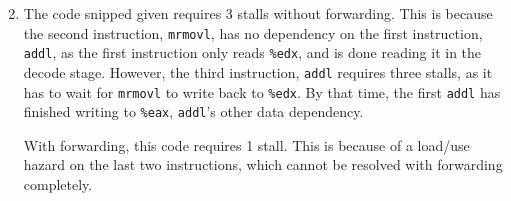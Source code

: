 \documentclass[12pt]{article}
\begin{document}
\begin{enumerate}
	\setcounter{enumi}{1}
	\item The code snipped given requires 3 stalls without forwarding.  This is
	because the second instruction, \texttt{mrmovl}, has no dependency
	on the first instruction, \texttt{addl}, as the first instruction only reads
	\texttt{\%edx}, and is done reading it in the decode stage.  However, the third
	instruction, \texttt{addl} requires three stalls, as it has to wait for
	\texttt{mrmovl} to write back to \texttt{\%edx}.  By that time, the
	first \texttt{addl} has finished writing to \texttt{\%eax}, \texttt{addl}'s
	other data dependency.  
	
	With forwarding, this code requires 1 stall.  This is because of a load/use
	hazard on the last two instructions, which cannot be resolved with forwarding
	completely.  
\end{enumerate}
\end{document}
